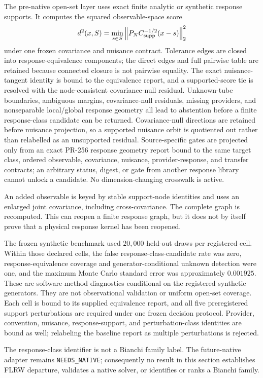 The pre-native open-set layer uses exact finite analytic or synthetic
response supports.  It computes the squared observable-space score
\[
 d^2(x,S)=\min_{s\in S}
 \left\|P_N C_{\rm supp}^{-1/2}(x-s)\right\|_2^2
\]
under one frozen covariance and nuisance contract.  Tolerance edges
are closed into response-equivalence components; the direct edges and
full pairwise table are retained because connected closure is not
pairwise equality.  The exact nuisance-tangent identity is bound to
the equivalence report, and a supported-score tie is resolved with the
node-consistent covariance-null residual.  Unknown-tube boundaries, ambiguous margins,
covariance-null residuals, missing providers, and nonseparable
local/global response geometry all lead to abstention before a finite
response-class candidate can be returned.  Covariance-null directions
are retained before nuisance projection, so a supported nuisance orbit
is quotiented out rather than relabelled as an unsupported residual.
Source-specific gates are projected only from an exact PR-256 response
geometry report bound to the same target class, ordered observable,
covariance, nuisance, provider-response, and transfer contracts; an
arbitrary status, digest, or gate from another response library cannot
unlock a candidate.  No dimension-changing crosswalk is active.

An added observable is keyed by stable support-node identities and
uses an enlarged joint covariance, including cross-covariance.  The
complete graph is recomputed.  This can reopen a finite response
graph, but it does not by itself prove that a physical response kernel
has been reopened.

The frozen synthetic benchmark used $20{,}000$ held-out draws per
registered cell.  Within those declared cells, the false
response-class-candidate rate was zero, response-equivalence coverage
and generator-conditional unknown detection were one, and the maximum
Monte Carlo standard error was approximately $0.001925$.  These are
software-method diagnostics conditional on the registered synthetic
generators.  They are not observational validation or uniform
open-set coverage.  Each cell is bound to its supplied equivalence
report, and all five preregistered support perturbations are required
under one frozen decision protocol.  Provider, convention, nuisance,
response-support, and perturbation-class identities are bound as well;
relabeling the baseline report as multiple perturbations is rejected.

The response-class identifier is not a Bianchi family label.  The
future-native adapter remains \texttt{NEEDS\_NATIVE}; consequently no
result in this section establishes FLRW departure, validates a native
solver, or identifies or ranks a Bianchi family.
